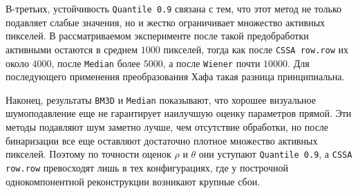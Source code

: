 В-третьих, устойчивость \texttt{Quantile 0.9} связана с тем, что этот метод
не только подавляет слабые значения, но и жестко ограничивает множество
активных пикселей. В рассматриваемом эксперименте после такой предобработки
активными остаются в среднем $1000$ пикселей, тогда как после
\texttt{CSSA row.row} их около $4000$, после \texttt{Median} более $5000$, а
после \texttt{Wiener} почти $10000$. Для последующего применения
преобразования Хафа такая разница принципиальна.

Наконец, результаты \texttt{BM3D} и \texttt{Median} показывают, что хорошее
визуальное шумоподавление еще не гарантирует наилучшую оценку параметров
прямой. Эти методы подавляют шум заметно лучше, чем отсутствие обработки, но
после бинаризации все еще оставляют достаточно плотное множество активных
пикселей. Поэтому по точности оценок $\rho$ и $\theta$ они уступают
\texttt{Quantile 0.9}, а \texttt{CSSA row.row} превосходят лишь в тех
конфигурациях, где у построчной однокомпонентной реконструкции возникают
крупные сбои.
